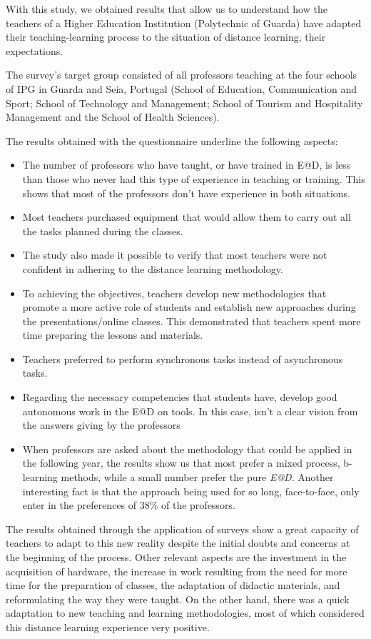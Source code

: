 \documentclass[english]{textolivre}
\begin{document}
With this study, we obtained results that allow us to understand how the teachers of a Higher Education Institution (Polytechnic of Guarda) have adapted their teaching-learning process to the situation of distance learning, their expectations.

The survey's target group consisted of all professors teaching at the four schools of IPG in Guarda and Seia, Portugal (School of Education, Communication and Sport; School of Technology and Management; School of Tourism and Hospitality Management and the School of Health Sciences). 

The results obtained with the questionnaire underline the following aspects:

\begin{itemize}
    \item The number of professors who have taught, or have trained in E@D, is less than those who never had this type of experience in teaching or training. This shows that most of the professors don't have experience in both situations.
    \item Most teachers purchased equipment that would allow them to carry out all the tasks planned during the classes.
    \item The study also made it possible to verify that most teachers were not confident in adhering to the distance learning methodology.
    \item To achieving the objectives, teachers develop new methodologies that promote a more active role of students and establish new approaches during the presentations/online classes. This demonstrated that teachers spent more time preparing the lessons and materials.
    \item Teachers preferred to perform synchronous tasks instead of asynchronous tasks.
    \item Regarding the necessary competencies that students have, develop good autonomous work in the E@D on tools. In this case, isn't a clear vision from the answers giving by the professors
    \item When professors are asked about the methodology that could be applied in the following year, the results show us that most prefer a mixed process, b-learning methods, while a small number prefer the pure \emph{E@D}. Another interesting fact is that the approach being used for so long, face-to-face, only enter in the preferences of 38\% of the professors.
\end{itemize}

The results obtained through the application of surveys show a great capacity of teachers to adapt to this new reality despite the initial doubts and concerns at the beginning of the process. Other relevant aspects are the investment in the acquisition of hardware, the increase in work resulting from the need for more time for the preparation of classes, the adaptation of didactic materials, and reformulating the way they were taught. On the other hand, there was a quick adaptation to new teaching and learning methodologies, most of which considered this distance learning experience very positive.
\end{document}
